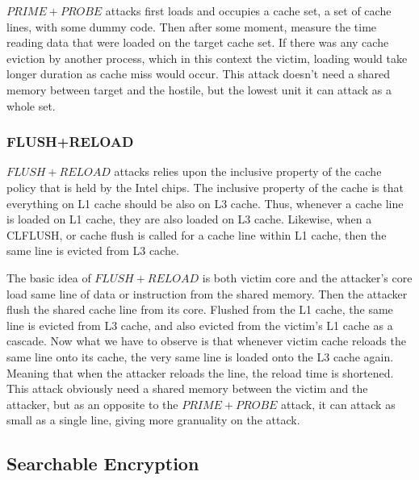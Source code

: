 \documentclass[a4paper]{article}
\begin{document}
$PRIME+PROBE$ attacks \cite{osvik2006cache} first loads and occupies a cache set, a set of cache lines, with some dummy code. Then after some moment, measure the time reading data that were loaded on the target cache set. If there was any cache eviction by another process, which in this context the victim, loading would take longer duration as cache miss would occur. This attack doesn't need a shared memory between target and the hostile, but the lowest unit it can attack as a whole set.

\subsubsection{FLUSH+RELOAD}

$FLUSH+RELOAD$ \cite{yarom2014flush+} attacks relies upon the inclusive property of the cache policy that is held by the Intel chips. The inclusive property of the cache is that everything on L1 cache should be also on L3 cache. Thus, whenever a cache line is loaded on L1 cache, they are also loaded on L3 cache. Likewise, when a CLFLUSH, or cache flush is called for a cache line within L1 cache, then the same line is evicted from L3 cache.\par
The basic idea of $FLUSH+RELOAD$ is both victim core and the attacker's core load same line of data or instruction from the shared memory. Then the attacker flush the shared cache line from its core. Flushed from the L1 cache, the same line is evicted from L3 cache, and also evicted from the victim's L1 cache as a cascade. Now what we have to observe is that whenever victim cache reloads the same line onto its cache, the very same line is loaded onto the L3 cache again. Meaning that when the attacker reloads the line, the reload time is shortened. This attack obviously need a shared memory between the victim and the attacker, but as an opposite to the $PRIME+PROBE$ attack, it can attack as small as a single line, giving more granuality on the attack.

\subsection{Searchable Encryption}
\end{document}
